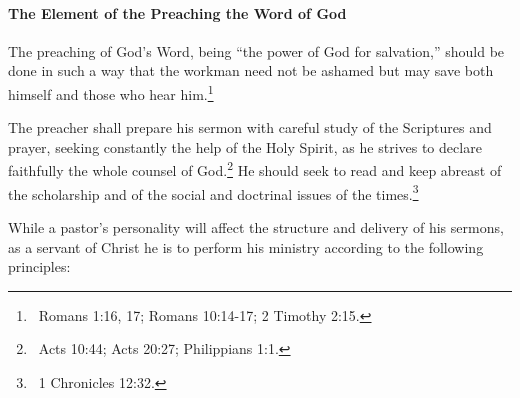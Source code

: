 \begin{outerlst}[left=0pt,labelsep=0pt]
\paragraph[The Element of the Preaching the Word of God]{The Element of the Preaching the Word of God}  

\begin{innerlst}[resume*]
      \item The preaching of God's Word, being ``the power of God for salvation,'' should be done in such a way that the workman need not be ashamed but may save both himself and those who hear him.\footnote{\ Romans 1:16, 17; Romans 10:14-17; 2 Timothy 2:15.}  
      \item The preacher shall prepare his sermon with careful study of the Scriptures and prayer, seeking constantly the help of the Holy Spirit, as he strives to declare faithfully the whole counsel of God.\footnote{\ Acts 10:44; Acts 20:27; Philippians 1:1.} He should seek to read and keep abreast of the scholarship and of the social and doctrinal issues of the times.\footnote{\ 1 Chronicles 12:32.}  
      \item While a pastor's personality will affect the structure and delivery of his sermons, as a servant of Christ he is to perform his ministry according to the following principles: 
      \begin{enumerate}[label=\alph*)]

\end{enumerate}
\end{innerlst}
\end{outerlst}
